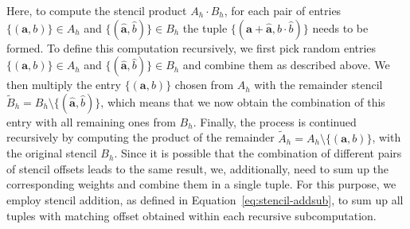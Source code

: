 Here, to compute the stencil product $A_h \cdot B_h$, for each pair of entries $\{(\bm{a}, b ) \} \in A_h$ and $\{(\bm{\hat{a}}, \hat{b} ) \} \in B_h$ the tuple $\{(\bm{a} + \bm{\hat{a}}, b \cdot \hat{b} ) \}$ needs to be formed.
To define this computation recursively, we first pick random entries $\{(\bm{a}, b ) \} \in A_h$ and $\{(\bm{\hat{a}}, \hat{b} ) \} \in B_h$ and combine them as described above.
We then multiply the entry $\{(\bm{a}, b ) \}$ chosen from $A_h$ with the remainder stencil $\tilde{B}_h = B_h \setminus \{(\bm{\hat{a}}, \hat{b} ) \}$, which means that we now obtain the combination of this entry with all remaining ones from $B_h$.
Finally, the process is continued recursively by computing the product of the remainder $\tilde{A}_h = A_h \setminus \{(\bm{a}, b ) \}$, with the original stencil $B_h$.
Since it is possible that the combination of different pairs of stencil offsets leads to the same result, we, additionally, need to sum up the corresponding weights and combine them in a single tuple.
For this purpose, we employ stencil addition, as defined in Equation~\eqref{eq:stencil-addsub}, to sum up all tuples with matching offset obtained within each recursive subcomputation.
